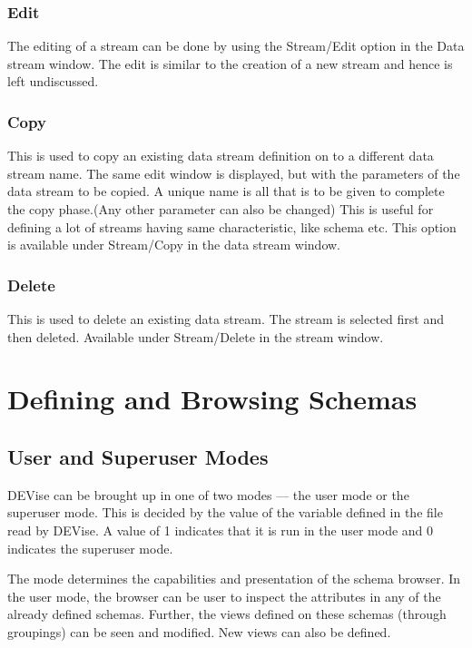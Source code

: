 
\subsubsection{Edit}

The editing of a stream can be done by using the Stream/Edit option in
the Data stream window. The edit is similar to the creation of a new
stream and hence is left undiscussed.

\subsubsection{Copy}

This is used to copy an existing data stream definition on to a
different data stream name. The same edit window is displayed, but
with the parameters of the data stream to be copied. A unique name is
all that is to be given to complete the copy phase.(Any other
parameter can also be changed) This is useful for defining a lot of
streams having same characteristic, like schema etc. This option is
available under Stream/Copy in the data stream window.

\subsubsection{Delete}

This is used to delete an existing data stream. The stream is selected
first and then deleted. Available under Stream/Delete in the stream
window.

\section{Defining and Browsing Schemas}

\subsection{User and Superuser Modes}

DEVise can be brought up in one of two modes --- the user mode or the
superuser mode.  This is decided by the value of the variable
 defined in the  file read by
DEVise.  A value of 1 indicates that it is run in the user mode and 0
indicates the superuser mode.

The mode determines the capabilities and presentation of the schema
browser.  In the user mode, the browser can be user to inspect the
attributes in any of the already defined schemas. Further, the views
defined on these schemas (through groupings) can be seen and
modified. New views can also be defined.

